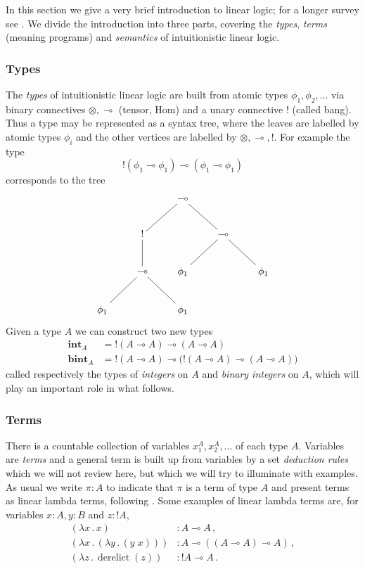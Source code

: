 \documentclass[english,letter paper,12pt,leqno]{article}
\theoremstyle{example}
\numberwithin{equation}{section}
\begin{document}
In this section we give a very brief introduction to linear logic; for a longer survey see \cite{murfet_ll,murfetclift}. We divide the introduction into three parts, covering the \emph{types}, \emph{terms} (meaning programs) and \emph{semantics} of intuitionistic linear logic.

\subsubsection{Types}

The \emph{types} of intuitionistic linear logic are built from atomic types $\phi_1,\phi_2,\ldots$ via binary connectives $\otimes, \multimap$ (tensor, Hom) and a unary connective ${!}$ (called bang). Thus a type may be represented as a syntax tree, where the leaves are labelled by atomic types $\phi_i$ and the other vertices are labelled by $\otimes, \multimap, {!}$. For example the type
\[
{!}(\phi_1 \multimap \phi_1) \multimap (\phi_1 \multimap \phi_1)
\]
corresponds to the tree
\[
\xymatrix{
& & \multimap\\
& {!}\ar@{-}[ur] & & \multimap\ar@{-}[ul]\\
& \multimap\ar@{-}[u] & \phi_1\ar@{-}[ur] & & \phi_1\ar@{-}[ul]\\
\phi_1 \ar@{-}[ur] & & \phi_1 \ar@{-}[ul]
}
\]
Given a type $A$ we can construct two new types
\begin{align*}
\textbf{int}_A &= {!}(A \multimap A) \multimap (A \multimap A)\\
\textbf{bint}_A &= {!}(A \multimap A) \multimap \big({!}(A \multimap A) \multimap (A \multimap A)\big)
\end{align*}
called respectively the types of \emph{integers} on $A$ and \emph{binary integers} on $A$, which will play an important role in what follows.

\subsubsection{Terms}

There is a countable collection of variables $x_1^A,x_2^A,\ldots$ of each type $A$. Variables are \emph{terms} and a general term is built up from variables by a set \emph{deduction rules} which we will not review here, but which we will try to illuminate with examples. As usual we write $\pi: A$ to indicate that $\pi$ is a term of type $A$ and present terms as linear lambda terms, following \cite{benton_etal}. Some examples of linear lambda terms are, for variables $x:A,y:B$ and $z:{!} A$,
\begin{align}
(\lambda x \,.\, x) &: A \multimap A\,, \label{eq:example_lambda_1}\\
(\lambda x \,.\, (\lambda y \,.\, (y \; x))) &: A \multimap ((A \multimap A) \multimap A)\,,\label{eq:example_lambda_2}\\
(\lambda z \,.\, \operatorname{derelict}(z)) &: {!} A \multimap A\,. \label{eq:example_lambda_3}
\end{align} 
\end{document}
